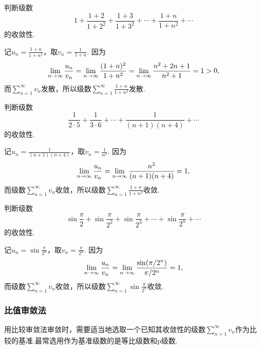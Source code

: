 \begin{example}
判断级数\[
1 + \frac{1+2}{1+2^2} + \frac{1+3}{1+3^2} + \dotsb + \frac{1+n}{1+n^2} + \dotsb
\]的收敛性.
\begin{solution}
记\(u_n = \frac{1+n}{1+n^2}\)，取\(v_n = \frac{1}{1+n}\).
因为\[
\lim\limits_{n\to\infty} \frac{u_n}{v_n}
= \lim\limits_{n\to\infty} \frac{(1+n)^2}{1+n^2}
= \lim\limits_{n\to\infty} \frac{n^2 + 2n + 1}{n^2 + 1}
= 1 > 0,
\]而\(\sum\limits_{n=1}^\infty v_n\)发散，所以级数\(\sum\limits_{n=1}^\infty \frac{1+n}{1+n^2}\)发散.
\end{solution}
\end{example}

\begin{example}
判断级数\[
\frac{1}{2\cdot5} + \frac{1}{3\cdot6} + \dotsb + \frac{1}{(n+1)(n+4)} + \dotsb
\]的收敛性.
\begin{solution}
记\(u_n = \frac{1}{(n+1)(n+4)}\)，取\(v_n = \frac{1}{n^2}\).
因为\[
\lim\limits_{n\to\infty} \frac{u_n}{v_n} = \lim\limits_{n\to\infty} \frac{n^2}{(n+1)(n+4)} = 1,
\]而级数\(\sum\limits_{n=1}^\infty v_n\)收敛，所以级数\(\sum\limits_{n=1}^\infty \frac{1+n}{1+n^2}\)收敛.
\end{solution}
\end{example}

\begin{example}
\newcommand\sinfrac[1][]{\sin\frac{\pi}{2^{#1}}}
判断级数\[
\sinfrac + \sinfrac[2] + \sinfrac[3] + \dotsb + \sinfrac[n] + \dotsb
\]的收敛性.
\begin{solution}
记\(u_n = \sin\frac{\pi}{2^n}\)，取\(v_n = \frac{\pi}{2^n}\).
因为\[
\lim\limits_{n\to\infty} \frac{u_n}{v_n}
= \lim\limits_{n\to\infty} \frac{\sin(\pi/2^n)}{\pi/2^n} = 1,
\]而级数\(\sum\limits_{n=1}^\infty v_n\)收敛，所以级数\(\sum\limits_{n=1}^\infty \sin\frac{\pi}{2^n}\)收敛.
\end{solution}
\end{example}

\subsubsection{比值审敛法}
用比较审敛法审敛时，需要适当地选取一个已知其收敛性的级数\(\sum\limits_{n=1}^\infty v_n\)作为比较的基准.最常选用作为基准级数的是等比级数和p级数.

